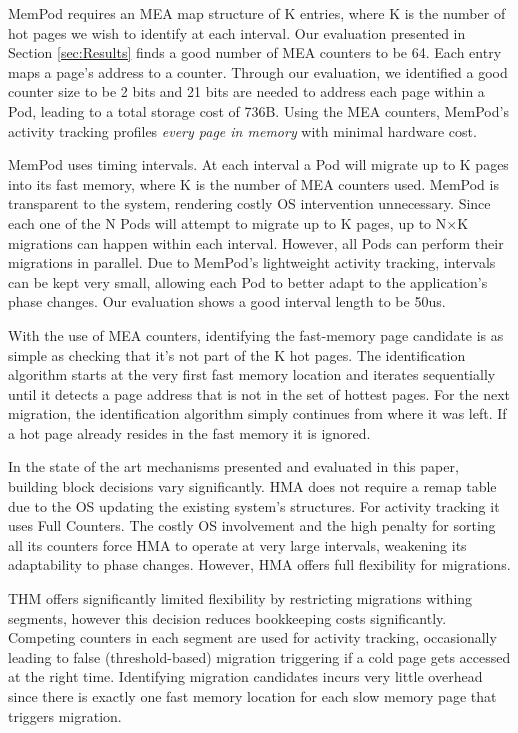 MemPod requires an MEA map structure of K entries, where K is the number of hot pages we wish to identify at each interval. Our evaluation presented in Section \ref{sec:Results} finds a good number of MEA counters to be 64. Each entry maps a page's address to a counter. Through our evaluation, we identified a good counter size to be 2 bits and 21 bits are needed to address each page within a Pod, leading to a total storage cost of 736B. Using the MEA counters, MemPod's activity tracking profiles \textit{every page in memory} with minimal hardware cost. 

MemPod uses timing intervals. At each interval a Pod will migrate up to K pages into its fast memory, where K is the number of MEA counters used. MemPod is transparent to the system, rendering costly OS intervention unnecessary. Since each one of the N Pods will attempt to migrate up to K pages, up to N$\times$K migrations can happen within each interval. However, all Pods can perform their migrations in parallel. Due to MemPod's lightweight activity tracking, intervals can be kept very small, allowing each Pod to better adapt to the application's phase changes. Our evaluation shows a good interval length to be 50us.

With the use of MEA counters, identifying the fast-memory page candidate is as simple as checking that it's not part of the K hot pages. The identification algorithm starts at the very first fast memory location and iterates sequentially until it detects a page address that is not in the set of hottest pages. For the next migration, the identification algorithm simply continues from where it was left. If a hot page already resides in the fast memory it is ignored.

In the state of the art mechanisms presented and evaluated in this paper, building block decisions vary significantly. HMA does not require a remap table due to the OS updating the existing system's structures. For activity tracking it uses Full Counters. The costly OS involvement and the high penalty for sorting all its counters force HMA to operate at very large intervals, weakening its adaptability to phase changes. However, HMA offers full flexibility for migrations.

THM offers significantly limited flexibility by restricting migrations withing segments, however this decision reduces bookkeeping costs significantly. Competing counters in each segment are used for activity tracking, occasionally leading to false (threshold-based) migration triggering if a cold page gets accessed at the right time. Identifying migration candidates incurs very little overhead since there is exactly one fast memory location for each slow memory page that triggers migration.

